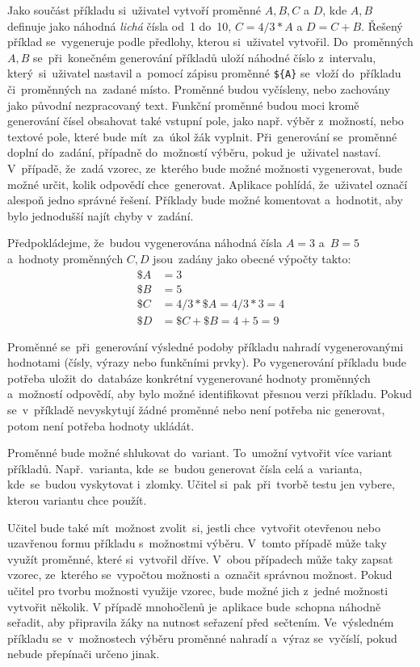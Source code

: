 \documentclass[11pt,a4paper]{report}
\begin{document}
            Jako součást příkladu si~uživatel vytvoří proměnné $A, B, C$ a $D$, kde $A, B$ definuje jako náhodná \emph{lichá} čísla od~1 do~10, $C = 4/3*A$ a $D = C + B$. Řešený příklad se~vygeneruje podle předlohy, kterou si~uživatel vytvořil. Do~proměnných $A, B$ se~při~konečném generování příkladů uloží náhodné číslo z~intervalu, který~si~uživatel nastavil a~pomocí zápisu proměnné \texttt{\$\{A\}} se~vloží do~příkladu či~proměnných na~zadané místo. Proměnné budou vyčísleny, nebo zachovány jako původní nezpracovaný text. Funkční proměnné budou moci kromě generování čísel obsahovat také vstupní pole, jako např. výběr z~možností, nebo textové pole, které bude mít~za~úkol žák vyplnit. Při~generování se~proměnné doplní do~zadání, případně do~možností výběru, pokud je~uživatel nastaví. V~případě, že~zadá vzorec, ze~kterého bude možné možnosti vygenerovat, bude možné určit, kolik odpovědí chce~generovat. Aplikace pohlídá, že~uživatel označí alespoň jedno správné řešení. Příklady bude možné komentovat a~hodnotit, aby bylo jednodušší najít chyby v~zadání.
            
            Předpokládejme, že~budou vygenerována náhodná čísla $A = 3$ a~$B = 5$ a~hodnoty proměnných $C, D$ jsou~zadány jako obecné výpočty takto:
            \begin{align*}
                \$A &= 3 \\
                \$B &= 5 \\
                \$C &= 4/3*\$A = 4/3*3 = 4 \\
                \$D &= \$C + \$B = 4 + 5 = 9
            \end{align*}

            Proměnné se~při~generování výsledné podoby příkladu nahradí vygenerovanými hodnotami (čísly, výrazy nebo funkčními prvky). Po vygenerování příkladu bude potřeba uložit do~databáze konkrétní vygenerované hodnoty proměnných a~možností odpovědí, aby bylo možné identifikovat přesnou verzi příkladu. Pokud se~v~příkladě nevyskytují žádné proměnné nebo není potřeba nic generovat, potom není potřeba hodnoty ukládát.

            Proměnné bude možné shlukovat do~variant. To~umožní vytvořit více variant příkladů. Např.~varianta, kde~se~budou generovat čísla celá a~varianta, kde~se~budou vyskytovat i~zlomky. Učitel si~pak~při~tvorbě testu jen vybere, kterou variantu chce použít.

            Učitel bude také mít~možnost zvolit~si, jestli chce~vytvořit otevřenou nebo uzavřenou formu příkladu s~možnostmi výběru. V~tomto případě může taky využít proměnné, které si~vytvořil dříve. V~obou případech může taky zapsat vzorec, ze~kterého se~vypočtou možnosti a~označit správnou možnost. Pokud učitel pro tvorbu možnosti využije vzorec, bude možné jich z~jedné možnosti vytvořit několik. V případě mnohočlenů je~aplikace bude~schopna náhodně seřadit, aby připravila žáky na nutnost seřazení před~sečtením. Ve~výsledném příkladu se~v~možnostech výběru proměnné nahradí a~výraz se~vyčíslí, pokud nebude přepínači určeno jinak.
\end{document}
